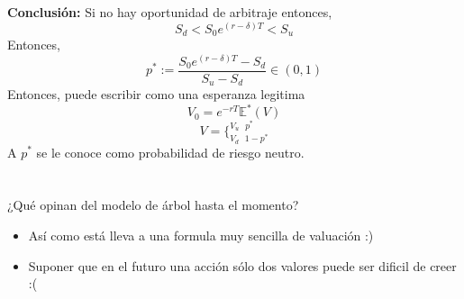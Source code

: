 \documentclass[12pts]{extarticle}
\begin{document}
\textbf{Conclusión:} Si no hay oportunidad de arbitraje entonces, 
$$S_d<S_0e^{(r-\delta)T}<S_u$$
Entonces, 
$$p^{*}:=\frac{S_0e^{(r-\delta)T}-S_d}{S_u-S_d} \in (0,1)$$
Entonces, puede escribir como una esperanza legitima
$$V_0=e^{-rT}\mathbb{E}^{*}(V)$$ 
$$V=\Bigg \{_{V_d \, \, \, \, 1-p^{*}}^{V_u  \, \, \, \, p^{*}}$$
A $p^{*}$ se le conoce como probabilidad de riesgo neutro.   
\\ \\ \\ 
¿Qué opinan del modelo de árbol hasta el momento?
\begin{itemize}
\item Así como está lleva a una formula muy sencilla de valuación :) 
\item Suponer que en el futuro una acción sólo dos valores puede ser dificil de creer :( 
\end{itemize}
\end{document}
